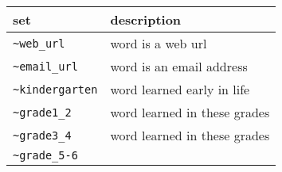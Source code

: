 \documentclass[]{article}
\begin{document}
\begin{longtable}[]{@{}ll@{}}
\toprule
\begin{minipage}[b]{0.22\columnwidth}\raggedright\strut
set\strut
\end{minipage} & \begin{minipage}[b]{0.10\columnwidth}\raggedright\strut
description\strut
\end{minipage}\tabularnewline
\midrule
\endhead
\begin{minipage}[t]{0.22\columnwidth}\raggedright\strut
\texttt{\textasciitilde{}web\_url}\strut
\end{minipage} & \begin{minipage}[t]{0.10\columnwidth}\raggedright\strut
word is a web url\strut
\end{minipage}\tabularnewline
\begin{minipage}[t]{0.22\columnwidth}\raggedright\strut
\texttt{\textasciitilde{}email\_url}\strut
\end{minipage} & \begin{minipage}[t]{0.10\columnwidth}\raggedright\strut
word is an email address\strut
\end{minipage}\tabularnewline
\begin{minipage}[t]{0.22\columnwidth}\raggedright\strut
\texttt{\textasciitilde{}kindergarten}\strut
\end{minipage} & \begin{minipage}[t]{0.10\columnwidth}\raggedright\strut
word learned early in life\strut
\end{minipage}\tabularnewline
\begin{minipage}[t]{0.22\columnwidth}\raggedright\strut
\texttt{\textasciitilde{}grade1\_2}\strut
\end{minipage} & \begin{minipage}[t]{0.10\columnwidth}\raggedright\strut
word learned in these grades\strut
\end{minipage}\tabularnewline
\begin{minipage}[t]{0.22\columnwidth}\raggedright\strut
\texttt{\textasciitilde{}grade3\_4}\strut
\end{minipage} & \begin{minipage}[t]{0.10\columnwidth}\raggedright\strut
word learned in these grades\strut
\end{minipage}\tabularnewline
\begin{minipage}[t]{0.22\columnwidth}\raggedright\strut
\texttt{\textasciitilde{}grade\_5-6}\strut
\end{minipage} & \begin{minipage}[t]{0.10\columnwidth}\raggedright\strut

\end{minipage}
\end{longtable}
\end{document}
